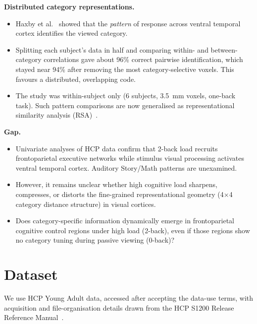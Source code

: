 \documentclass[10pt,a4paper]{article}
\begin{document}
\textbf{\sffamily\color{accent}Distributed category representations.}
\begin{itemize}
  \item Haxby et al.~\cite{haxby2001} showed that the \emph{pattern} of response across ventral temporal cortex identifies the viewed category.
  \item Splitting each subject's data in half and comparing within- and between-category correlations gave about 96\% correct pairwise identification, which stayed near 94\% after removing the most category-selective voxels. This favours a distributed, overlapping code.
  \item The study was within-subject only (6 subjects, 3.5~mm voxels, one-back task). Such pattern comparisons are now generalised as representational similarity analysis (RSA)~\cite{kriegeskorte2008}.
\end{itemize}

\textbf{\sffamily\color{accent}Gap.}
\begin{itemize}
  \item Univariate analyses of HCP data confirm that 2-back load recruits frontoparietal executive networks while stimulus visual processing activates ventral temporal cortex. Auditory Story/Math patterns are unexamined.
  \item However, it remains unclear whether high cognitive load sharpens, compresses, or distorts the fine-grained representational geometry (4$\times$4 category distance structure) in visual cortices.
  \item Does category-specific information dynamically emerge in frontoparietal cognitive control regions under high load (2-back), even if those regions show no category tuning during passive viewing (0-back)?
\end{itemize}


\section{Dataset}
We use HCP Young Adult data, accessed after accepting the data-use terms, with acquisition and file-organisation details drawn from the HCP S1200 Release Reference Manual~\cite{hcps1200manual}.
\end{document}
